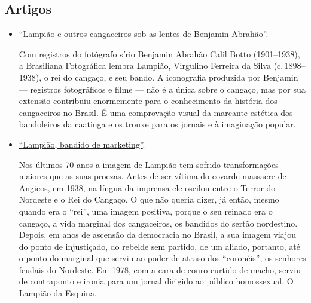 \documentclass[11pt]{extarticle}
\begin{document}
\subsection{Artigos}

\begin{itemize}
\item \href{https://brasilianafotografica.bn.gov.br/?p=9527}{``Lampião e outros cangaceiros sob as lentes de Benjamin Abrahão''}. 

Com registros do fotógrafo sírio Benjamin Abrahão Calil Botto (1901--1938), a Brasiliana Fotográfica lembra Lampião, 
Virgulino Ferreira da Silva (c.\,1898--1938), o rei do cangaço, e seu bando. A iconografia produzida por Benjamin --- registros fotográficos e filme --- não é a única sobre o cangaço, mas por sua extensão contribuiu enormemente para o conhecimento da história dos cangaceiros no Brasil. É uma comprovação visual da marcante estética dos bandoleiros da caatinga e os trouxe para os jornais e à imaginação popular.

\item \href{http://www.historianet.com.br/conteudo/default.aspx?codigo=863}{``Lampião, bandido de marketing''}.

Nos últimos 70 anos a imagem de Lampião tem sofrido transformações maiores que as suas proezas. Antes de ser vítima do covarde massacre de Angicos, em 1938, na língua da imprensa ele oscilou entre o Terror do Nordeste e o Rei do Cangaço. O que não queria dizer, já então, mesmo quando era o ``rei'', uma imagem positiva, porque o seu reinado era o cangaço, a vida marginal dos cangaceiros, os bandidos do sertão nordestino. Depois, em anos de ascensão da democracia no Brasil, a sua imagem viajou do ponto de injustiçado, do rebelde sem partido, de um aliado, portanto, até o ponto do marginal que serviu ao poder de atraso dos ``coronéis'', os senhores feudais do Nordeste. Em 1978, com a cara de couro curtido de macho, serviu de contraponto e ironia para um jornal dirigido ao público homossexual, O Lampião da Esquina.

\end{itemize}
\end{document}
